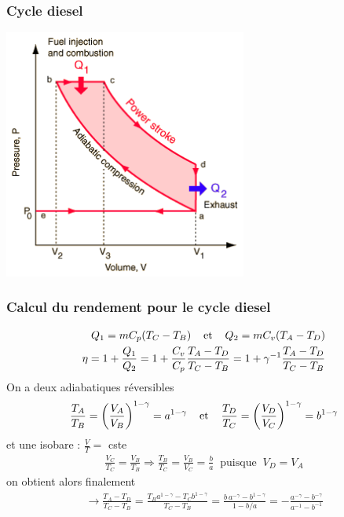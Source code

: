 \documentclass{beamer}
\begin{document}
\begin{frame}
\frametitle{Cycle diesel}
\centerline {\includegraphics[width=8cm]{cycle_diesel}}
\end{frame}


\begin{frame}
\frametitle{Calcul du rendement pour le cycle diesel}
\begin{eqnarray}
Q_1 =  mC_p(T_C-T_B) \hspace{0.4cm}\mathrm{et} \hspace{0.4cm} Q_2 =  mC_v(T_A-T_D)\\
\eta = 1 + \frac{Q_1}{Q_2} = 1 + \frac{C_v}{C_p}\frac{T_A-T_D}{T_C-T_B} = 1+ \gamma^{-1}\frac{T_A-T_D}{T_C-T_B}
\end{eqnarray}
On a deux adiabatiques réversibles
\begin{eqnarray}
\frac{T_A}{T_B} = \left(\frac{V_A}{V_B}\right)^{1-\gamma} = a^{1-\gamma}\hspace{0.4cm}\mathrm{et} \hspace{0.4cm}  \frac{T_D}{T_C} = \left(\frac{V_D}{V_C}\right)^{1-\gamma} = b^{1-\gamma}
\end{eqnarray}
et une isobare : $\frac{V}{T} = $ cste
\begin{eqnarray}
\frac{V_C}{T_C} = \frac{V_B}{T_B} \Rightarrow \frac{T_B}{T_C} = \frac{V_B}{V_C} = \frac{b}{a}\;\; \mathrm{puisque}\;\; V_D=V_A
\end{eqnarray}
on obtient alors finalement
\begin{eqnarray}
\rightarrow \frac{T_A-T_D}{T_C-T_B} = \frac{T_B a^{1-\gamma} - T_C b^{1-\gamma}}{T_C-T_B} = \frac{b\,a^{-\gamma} -  b^{1-\gamma}}{1-b/a} = -\frac{a^{-\gamma} -  b^{-\gamma}}{a^{-1}-b^{-1}}\\
\nonumber
\end{eqnarray}
\end{frame}
\end{document}
